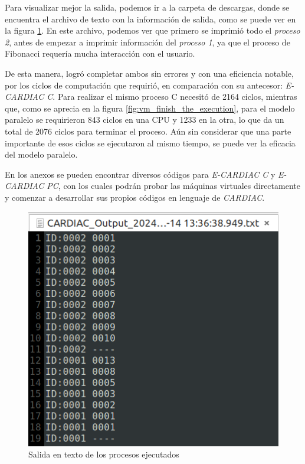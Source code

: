 \documentclass[letterpaper,12pt,oneside]{book}
\begin{document}
		\newpage
			Para visualizar mejor la salida, podemos ir a la carpeta de descargas, donde se encuentra el archivo 
			de texto con la información de salida, como se puede ver en la figura \ref{fig:ouput_vm_pintor_fibonacci}. 
			En este archivo, podemos ver que primero se imprimió todo
			el \textit{proceso 2}, antes de empezar a 
			imprimir información del \textit{proceso 1}, ya que el proceso de Fibonacci requería mucha interacción
			con el usuario. 
			
			
			De esta manera, logró completar ambos sin errores y con una eficiencia notable, por los ciclos de computación
			que requirió, en comparación
			con su antecesor: \textit{E-CARDIAC C}. Para realizar el mismo proceso C necesitó de 2164 ciclos, mientras que,
			como se aprecia en la figura \ref{fig:vm_finish_the_execution}, para el modelo paralelo se requirieron 843 ciclos en una CPU
			y 1233 en la otra, lo que da un total de 2076 ciclos para terminar el proceso. Aún sin considerar que  una parte importante de esos
			ciclos se ejecutaron al mismo tiempo, se puede ver la eficacia del modelo paralelo.
			
			
			En los anexos se pueden encontrar diversos códigos para \textit{E-CARDIAC C} y \textit{E-CARDIAC PC}, con los cuales podrán
			probar las máquinas virtuales directamente y comenzar a desarrollar sus propios códigos en lenguaje de \textit{CARDIAC}.
			
			 
			
			\begin{figure}[h]		
				\centering
				\includegraphics[scale=0.6]{media/Paralela/ouput_vm_pintor_fibonacci.png}
				\caption{Salida en texto de los procesos ejecutados}
				\label{fig:ouput_vm_pintor_fibonacci}
			\end{figure}
			
\end{document}
